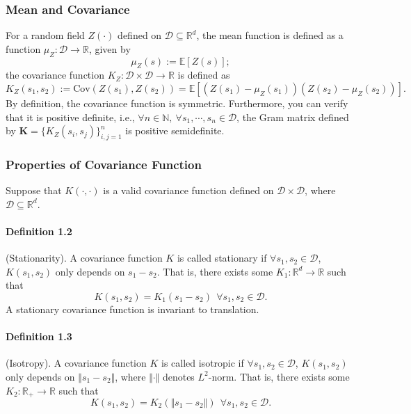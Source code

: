 \documentclass{article}
\begin{document}
\subsubsection{Mean and Covariance}
For a random field $Z(\cdot)$ defined on $\mathcal{D}\subseteq \mathbb{R}^d$, the mean function is defined as a function $\mu_Z:\mathcal{D}\to\mathbb{R}$, given by
\begin{equation*}
	\mu_Z(s) := \mathbb{E}[Z(s)];\tag{1.2}
\end{equation*}
the covariance function $K_Z:\mathcal{D}\times\mathcal{D}\to\mathbb{R}$ is defined as
\begin{equation*}
	K_Z(s_1,s_2) := \mathrm{Cov}\left(Z(s_1),Z(s_2)\right) = \mathbb{E}\left[\left(Z(s_1)-\mu_Z(s_1)\right)\left(Z(s_2)-\mu_Z(s_2)\right)\right].\tag{1.3}
\end{equation*}
By definition, the covariance function is symmetric. Furthermore, you can verify that it is positive definite, i.e., $\forall n\in\mathbb{N},\ \forall s_1,\cdots,s_n\in\mathcal{D}$, the Gram matrix defined by $\mathbf{K} = \lbrace K_Z(s_i,s_j)\rbrace_{i,j=1}^n$ is positive semidefinite.

\subsubsection{Properties of Covariance Function}
Suppose that $K(\cdot,\cdot)$ is a valid covariance function defined on $\mathcal{D}\times\mathcal{D}$, where $\mathcal{D}\subseteq\mathbb{R}^d$.

\paragraph{Definition 1.2} (Stationarity). A covariance function $K$ is called stationary if $\forall s_1,s_2\in\mathcal{D}$, $K(s_1,s_2)$ only depends on $s_1-s_2$. That is, there exists some $K_1:\mathbb{R}^d\to\mathbb{R}$ such that
\begin{equation*}
	K(s_1,s_2) = K_1(s_1-s_2)\ \ \forall s_1,s_2\in\mathcal{D}.\tag{1.4}
\end{equation*}
A stationary covariance function is invariant to translation.

\paragraph{Definition 1.3} (Isotropy). A covariance function $K$ is called isotropic if $\forall s_1,s_2\in\mathcal{D}$, $K(s_1,s_2)$ only depends on $\Vert s_1-s_2\Vert$, where $\Vert\cdot\Vert$ denotes $L^2$-norm. That is, there exists some $K_2:\mathbb{R}_+\to\mathbb{R}$ such that
\begin{equation*}
	K(s_1,s_2) = K_2(\Vert s_1-s_2\Vert)\ \ \forall s_1,s_2\in\mathcal{D}.\tag{1.5}
\end{equation*}
\end{document}
